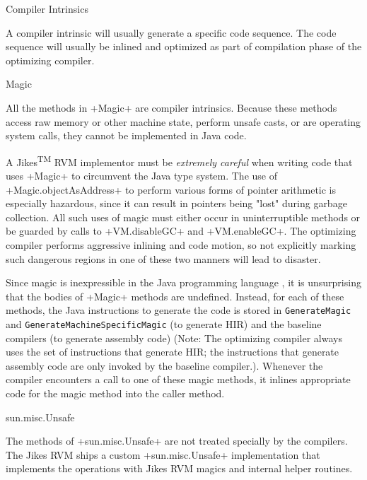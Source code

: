 \begin{section}{Compiler Intrinsics}
\label{sec:compilerintrinsics}

A compiler intrinsic will usually generate a specific code sequence. The code sequence will usually be inlined and optimized as part of compilation phase of the optimizing compiler.

\begin{subsubsection}{Magic}

All the methods in \spverb+Magic+ are compiler intrinsics. Because these methods access raw memory or other machine state, perform unsafe casts, or are operating system calls, they cannot be implemented in Java code.

A Jikes\textsuperscript{TM} RVM implementor must be \textit{extremely careful} when writing code that uses \spverb+Magic+ to circumvent the Java type system. The use of \spverb+Magic.objectAsAddress+ to perform various forms of pointer arithmetic is especially hazardous, since it can result in pointers being "lost" during garbage collection. All such uses of magic must either occur in uninterruptible methods or be guarded by calls to \spverb+VM.disableGC+ and \spverb+VM.enableGC+. The optimizing compiler performs aggressive inlining and code motion, so not explicitly marking such dangerous regions in one of these two manners will lead to disaster.

Since magic is inexpressible in the Java programming language , it is unsurprising that the bodies of \spverb+Magic+ methods are undefined. Instead, for each of these methods, the Java instructions to generate the code is stored in \texttt{Ge\-ne\-ra\-te\-Ma\-gic} and \texttt{Ge\-ne\-ra\-te\-Ma\-chi\-ne\-Spe\-ci\-fic\-Ma\-gic} (to generate HIR) and the baseline compilers (to generate assembly code) (Note: The optimizing compiler always uses the set of instructions that generate HIR; the instructions that generate assembly code are only invoked by the baseline compiler.). Whenever the compiler encounters a call to one of these magic methods, it inlines appropriate code for the magic method into the caller method.

\end{subsubsection}

\begin{subsubsection}{sun.misc.Unsafe}

The methods of \spverb+sun.misc.Unsafe+ are not treated specially by the compilers. The Jikes RVM ships a custom \spverb+sun.misc.Unsafe+ implementation that implements the operations with Jikes RVM magics and internal helper routines.

\end{subsubsection}

\end{section}
